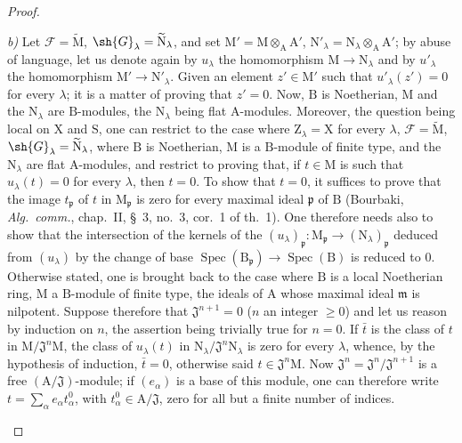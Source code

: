 \begin{proof}
\begin{enumerate}[label=(\roman*)]
  \emph{b)} Let $\mathscr{F}=\widetilde{\mathrm{M}}$, $\sh{G}_\lambda=\widetilde{\mathrm{N}}_\lambda$, and set $\mathrm{M}'=\mathrm{M}\otimes_\mathrm{A}\mathrm{A}'$, $\mathrm{N}'_\lambda=\mathrm{N}_\lambda\otimes_\mathrm{A}\mathrm{A}'$; by abuse of language, let us denote again by $u_\lambda$ the homomorphism $\mathrm{M}\to\mathrm{N}_\lambda$ and by $u'_\lambda$ the homomorphism $\mathrm{M}'\to\mathrm{N}'_\lambda$.
  Given an element $z'\in\mathrm{M}'$ such that $u'_\lambda(z')=0$ for every $\lambda$; it is a matter of proving that $z'=0$.
  Now, $\mathrm{B}$ is Noetherian, $\mathrm{M}$ and the $\mathrm{N}_\lambda$ are $\mathrm{B}$-modules, the $\mathrm{N}_\lambda$ being flat $\mathrm{A}$-modules.
  Moreover, the question being local on $\mathrm{X}$ and $\mathrm{S}$, one can restrict to the case where $\mathrm{Z}_\lambda=\mathrm{X}$ for every $\lambda$, $\mathscr{F}=\widetilde{\mathrm{M}}$, $\sh{G}_\lambda=\widetilde{\mathrm{N}}_\lambda$, where $\mathrm{B}$ is Noetherian, $\mathrm{M}$ is a $\mathrm{B}$-module of finite type, and the $\mathrm{N}_\lambda$ are flat $\mathrm{A}$-modules, and restrict to proving that, if $t\in\mathrm{M}$ is such that $u_\lambda(t)=0$ for every $\lambda$, then $t=0$.
  To show that $t=0$, it suffices to prove that the image $t_\mathfrak{p}$ of $t$ in $\mathrm{M}_\mathfrak{p}$ is zero for every maximal ideal $\mathfrak{p}$ of $\mathrm{B}$ (Bourbaki, \emph{Alg.\ comm.}, chap.~II, \S~3, no.~3, cor.~1 of th.~1).
  One therefore needs also to show that the intersection
  of the kernels of the $(u_\lambda)_\mathfrak{p}:\mathrm{M}_\mathfrak{p}\to(\mathrm{N}_\lambda)_\mathfrak{p}$ deduced from $(u_\lambda)$ by the change of base $\operatorname{Spec}(\mathrm{B}_\mathfrak{p})\to\operatorname{Spec}(\mathrm{B})$ is reduced to $0$.
  Otherwise stated, one is brought back to the case where $\mathrm{B}$ is a local Noetherian ring, $\mathrm{M}$ a $\mathrm{B}$-module of finite type, the ideals of $\mathrm{A}$ whose maximal ideal $\mathfrak{m}$ is nilpotent.
  Suppose therefore that $\mathfrak{J}^{n+1}=0$ ($n$ an integer $\geq 0$) and let us reason by induction on $n$, the assertion being trivially true for $n=0$.
  If $\bar{t}$ is the class of $t$ in $\mathrm{M}/\mathfrak{J}^n\mathrm{M}$, the class of $u_\lambda(t)$ in $\mathrm{N}_\lambda/\mathfrak{J}^n\mathrm{N}_\lambda$ is zero for every $\lambda$, whence, by the hypothesis of induction, $\bar{t}=0$, otherwise said $t\in\mathfrak{J}^n\mathrm{M}$.
  Now $\mathfrak{J}^n=\mathfrak{J}^n/\mathfrak{J}^{n+1}$ is a free $(\mathrm{A}/\mathfrak{J})$-module; if $(e_\alpha)$ is a base of this module, one can therefore write $t=\sum_\alpha e_\alpha t_\alpha^0$, with $t_\alpha^0\in\mathrm{A}/\mathfrak{J}$, zero for all but a finite number of indices.

\end{enumerate}
\end{proof}
